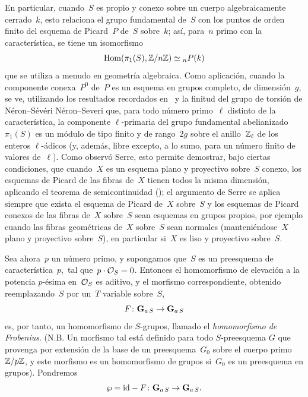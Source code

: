 En particular, cuando~$S$ es propio y conexo sobre un cuerpo algebraicamente
cerrado~$k$, esto relaciona el grupo fundamental de~$S$ con los puntos de
orden finito del esquema de Picard~$P$ de~$S$ sobre~$k$; así, para~$n$ primo
con la característica, se tiene un isomorfismo
$$
\Hom(\pi_1(S),\ZZ/n\ZZ)\simeq {_n P}(k)
$$
que se utiliza a menudo en geometría
algebraica. Como aplicación, cuando la componente conexa~$P^0$ de~$P$ es un
esquema en grupos completo, de dimensión~$g$, se ve, utilizando los
resultados recordados en~ y la finitud del grupo de torsión de
{Néron--Sévéri}
{Néron--Severi}
que, para todo número primo~$\ell$ distinto de la característica, la
componente $\ell$-primaria del grupo fundamental abelianizado~$\pi_1(S)$ es
un módulo de tipo finito y de rango~$2g$ sobre el anillo~$\ZZ_\ell$ de los
enteros $\ell$-ádicos (y, además, libre excepto, a lo sumo, para un número
finito de valores de~$\ell$). Como observó Serre, esto permite demostrar,
bajo ciertas condiciones, que cuando~$X$ es un esquema plano y proyectivo
sobre~$S$ conexo, los esquemas de Picard de las fibras de~$X$ tienen todos
la misma dimensión, aplicando el teorema de semicontinuidad
(); el argumento de Serre se aplica siempre que exista el esquema
de Picard de~$X$ sobre~$S$ y los esquemas de Picard conexos de las fibras
de~$X$ sobre~$S$ sean esquemas en grupos propios, por ejemplo cuando las
fibras geométricas de~$X$ sobre~$S$ sean normales (manteniéndose~$X$ plano y proyectivo
sobre~$S$), en particular si~$X$ es liso y proyectivo sobre~$S$.

Sea ahora~$p$ un número primo, y supongamos que~$S$ es un preesquema de
característica~$p$, \,\ie tal que~$p\cdot\cal{O}_S=0$. Entonces el
homomorfismo de elevación a la potencia $p$-ésima en~$\cal{O}_S$ es aditivo,
y el morfismo correspondiente, obtenido reemplazando~$S$ por un~$T$ variable
sobre~$S$,
$$
F\colon\GG_{a\,S}\to\GG_{a\,S}
$$
es, por tanto, un homomorfismo de $S$-grupos, llamado el \emph{homomorfismo
de Frobenius}. (N.B. Un morfismo tal está definido para todo $S$-preesquema
$G$ que provenga por extensión de la base de un preesquema~$G_0$ sobre el
cuerpo primo~$\ZZ/p\ZZ$, y este morfismo es un homomorfismo de grupos si~$G_0$
es un preesquema en grupos). Pondremos
$$
\wp=\id-F\colon\GG_{a\,S}\to\GG_{a\,S}.
$$
